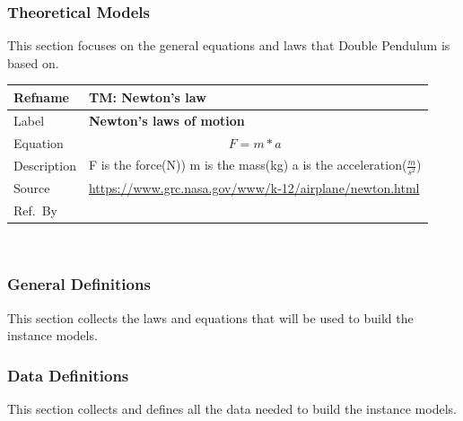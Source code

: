\documentclass[12pt]{article}
\newcommand{\colAwidth}{0.13\textwidth}
\newcommand{\colBwidth}{0.82\textwidth}
\begin{document}
\subsubsection{Theoretical Models}\label{sec_tm}
This section focuses on the general equations and laws that Double Pendulum is based on. 

\noindent
\begin{minipage}{\textwidth}
\renewcommand*{\arraystretch}{1.5}
\begin{tabular}{| p{\colAwidth} | p{\colBwidth}|}
  \hline
  \rowcolor[gray]{0.9}
  Refname& TM: Newton's law\\
  \hline
  Label&\bf Newton's laws of motion\\
  \hline
  Equation& \[F=m * a\]\\
  \hline
  Description & F is the force(N))\newline
                m is the mass(kg)\newline
                a is the acceleration(\( \frac{m}{s^{2}} \))\\
  \hline
  Source &
           \url{https://www.grc.nasa.gov/www/k-12/airplane/newton.html}\\
  
  Ref.\ By & \\
  \hline
\end{tabular}
\end{minipage}\\



\subsubsection{General Definitions}\label{sec_generalDef}
This section collects the laws and equations that will be used to build the instance models.


\subsubsection{Data Definitions}\label{sec_dataDef}
This section collects and defines all the data needed to build the instance models. \\
\end{document}
